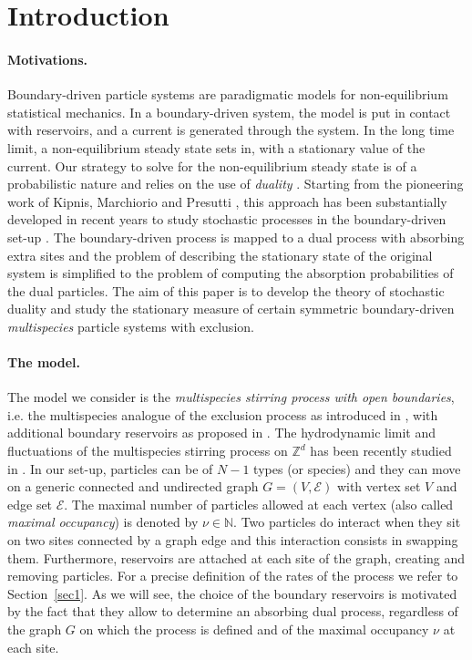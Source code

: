 \documentclass[10pt]{article}
\numberwithin{equation}{section}
\numberwithin{equation}{subsection}
\begin{document}

\newpage
\tableofcontents


 \newpage 
\section{Introduction} 

\paragraph{Motivations.}
Boundary-driven particle systems are paradigmatic models for non-equilibrium statistical mechanics. In a boundary-driven system, the model is put in contact with reservoirs, 
and a current is generated through the system. In the long time limit, a non-equilibrium steady state sets in, with a stationary value of the current.
Our strategy to solve for the non-equilibrium steady state is of a probabilistic nature and relies on the use of {\em duality} \cite{schutzSandow}. Starting from the pioneering work of Kipnis, Marchiorio and Presutti \cite{KMP}, this approach
has been substantially developed in recent years to study stochastic processes in the boundary-driven set-up \cite{giardina2009duality,carinci2013duality}.
The boundary-driven process is mapped to a dual process with absorbing extra sites and the problem of describing the stationary state of the original system
is simplified to the problem of computing the absorption probabilities of the dual particles.  
 The aim of this paper is to develop the theory of stochastic duality and  study the stationary measure of certain symmetric boundary-driven {\em multispecies} particle systems with exclusion.

\paragraph{The model.}
The model we consider is the {\em  multispecies stirring process with open boundaries}, 
i.e. the multispecies analogue of the exclusion process as introduced in \cite{zhou2021orthogonal}, 
with additional boundary reservoirs as proposed in \cite{vanicat2017exact}. 
The hydrodynamic limit and fluctuations of the multispecies stirring process on $\mathbb{Z}^d$
has been recently studied in \cite{casini2023density}.
In our set-up, particles can be of $N-1$ types (or species) and they can move
on a generic connected and undirected graph $G=(V,\mathcal{E})$ with vertex set $V$ and
edge set $\mathcal{E}$. The maximal number of particles allowed at each vertex (also called \textit{maximal occupancy}) is denoted by $\nu\in \mathbb{N}$. 
Two particles do interact when they sit on two sites connected by a graph edge and this interaction consists in swapping them. 
Furthermore, reservoirs are attached at each site of the graph, creating and removing particles. For a precise definition of the rates of the process 
we refer to Section~\ref{sec1}. As we will see, the choice of the boundary reservoirs is motivated by the fact that they allow to determine an absorbing dual process, 
regardless of the graph $G$ on which the process is defined and of the maximal occupancy $\nu$ at each site.
\end{document}
